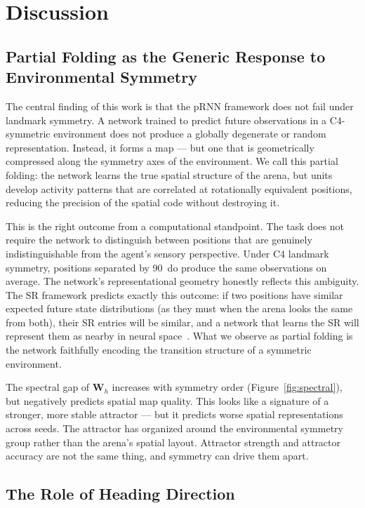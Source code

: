 \documentclass[11pt, a4paper]{article}
\begin{document}
\section{Discussion}
\label{sec:discussion}

\subsection{Partial Folding as the Generic Response to Environmental Symmetry}

The central finding of this work is that the pRNN framework does not fail
under landmark symmetry. A network trained to
predict future observations in a C4-symmetric environment does not produce
a globally degenerate or random representation. Instead, it forms a map
--- but one that is geometrically compressed along the symmetry axes of
the environment. We call this partial folding: the network learns the true
spatial structure of the arena, but units develop activity patterns that
are correlated at rotationally equivalent positions, reducing the
precision of the spatial code without destroying it.

This is the right outcome from a computational standpoint. The task does
not require the network to distinguish between positions that are
genuinely indistinguishable from the agent's sensory perspective. Under
C4 landmark symmetry, positions separated by 90\degree~do produce the
same observations on average. The network's representational geometry
honestly reflects this ambiguity. The SR framework predicts exactly this
outcome: if two positions have similar expected future state distributions
(as they must when the arena looks the same from both), their SR entries
will be similar, and a network that learns the SR will represent them as
nearby in neural space~\citep{stachenfeld2017}. What we observe as partial
folding is the network faithfully encoding the transition structure of a
symmetric environment.

The spectral gap of $\mathbf{W}_h$ increases with symmetry order
(Figure~\ref{fig:spectral}), but negatively predicts spatial map quality.
This looks like a signature of a stronger, more stable attractor ---
but it predicts worse spatial representations across seeds. The attractor
has organized around the environmental symmetry group rather than the
arena's spatial layout. Attractor strength and attractor accuracy are not
the same thing, and symmetry can drive them apart.

\subsection{The Role of Heading Direction}
\end{document}
